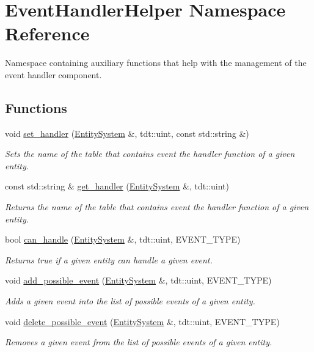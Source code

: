 \hypertarget{namespace_event_handler_helper}{}\section{Event\+Handler\+Helper Namespace Reference}
\label{namespace_event_handler_helper}


Namespace containing auxiliary functions that help with the management of the event handler component.  


\subsection*{Functions}
\begin{DoxyCompactItemize}
\item 
void \hyperlink{namespace_event_handler_helper_a82605cbba01a74ad95cf9e2a17b34aaa}{set\+\_\+handler} (\hyperlink{class_entity_system}{Entity\+System} \&, tdt\+::uint, const std\+::string \&)
\begin{DoxyCompactList}\small\item\em Sets the name of the table that contains event the handler function of a given entity. \end{DoxyCompactList}\item 
const std\+::string \& \hyperlink{namespace_event_handler_helper_a55c656679f1fb2fa4ddfa32737ed0e29}{get\+\_\+handler} (\hyperlink{class_entity_system}{Entity\+System} \&, tdt\+::uint)
\begin{DoxyCompactList}\small\item\em Returns the name of the table that contains event the handler function of a given entity. \end{DoxyCompactList}\item 
bool \hyperlink{namespace_event_handler_helper_abe76fc4dc9692faa86fc7165a843a6dc}{can\+\_\+handle} (\hyperlink{class_entity_system}{Entity\+System} \&, tdt\+::uint, E\+V\+E\+N\+T\+\_\+\+T\+Y\+PE)
\begin{DoxyCompactList}\small\item\em Returns true if a given entity can handle a given event. \end{DoxyCompactList}\item 
void \hyperlink{namespace_event_handler_helper_af250fe8af3f322ba3a71eb0bd21f5ceb}{add\+\_\+possible\+\_\+event} (\hyperlink{class_entity_system}{Entity\+System} \&, tdt\+::uint, E\+V\+E\+N\+T\+\_\+\+T\+Y\+PE)
\begin{DoxyCompactList}\small\item\em Adds a given event into the list of possible events of a given entity. \end{DoxyCompactList}\item 
void \hyperlink{namespace_event_handler_helper_a96395d97dd12c6233d319781c1468732}{delete\+\_\+possible\+\_\+event} (\hyperlink{class_entity_system}{Entity\+System} \&, tdt\+::uint, E\+V\+E\+N\+T\+\_\+\+T\+Y\+PE)
\begin{DoxyCompactList}\small\item\em Removes a given event from the list of possible events of a given entity. \end{DoxyCompactList}\end{DoxyCompactItemize}


